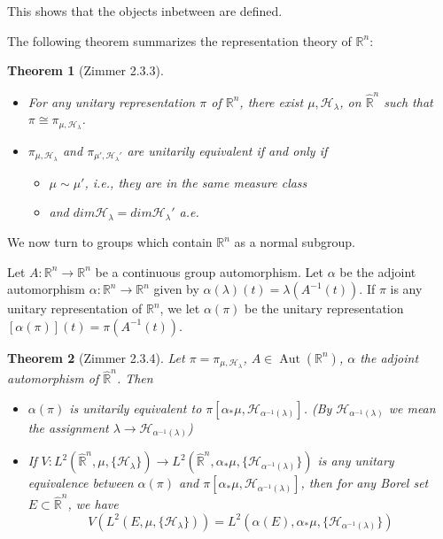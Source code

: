 \documentclass[
  12pt
]{article}
\newtheorem{thm}{Theorem}[section]
\theoremstyle{plain}
\newcommand{\mpi}{\ensuremath{\pi}\xspace}
\newcommand{\bbr}{\ensuremath{\mathbb{R}}\xspace}
\newcommand{\hilb}{\ensuremath{\mathscr{H}}\xspace}
\DeclareMathOperator{\Aut}{Aut}
\begin{document}
  This shows that the objects inbetween are defined.

  The following theorem summarizes the representation theory of $\bbr^n$:

  \begin{thm}[Zimmer 2.3.3]
    \label{thm:2.3.3}
    \begin{itemize}
      \item For any unitary representation $\pi$ of
        $\mathbb{R}^n$, there exist $\mu, \mathscr{H}_{\lambda}$, on
        $\hat{\mathbb{R}}^n$ such that $\pi \cong \pi_{\mu, \mathscr{H}_{\lambda}}$.
      \item $\pi_{\mu, \mathscr{H}_{\lambda}}$ and
        $\pi_{\mu', \mathscr{H}_{\lambda}'}$ are unitarily equivalent if and only if 
        \begin{itemize}
          \item $\mu \sim \mu'$, i.e., they are in the same measure class
          \item and $dim\mathscr{H}_{\lambda} = dim \mathscr{H}_{\lambda}'$ a.e.
        \end{itemize}
    \end{itemize}
  \end{thm}

  We now turn to groups which contain $\bbr^n$ as a normal subgroup.

  Let $A:\bbr^n \rightarrow \bbr^n$ be a continuous group automorphism. Let
  $\alpha$ be the adjoint automorphism $\alpha:\bbr^n \rightarrow \bbr^n$ given
  by $\alpha(\lambda)(t) = \lambda(A^{-1}(t))$. If \mpi is any unitary representation of $\bbr^n$, we let $\alpha(\pi)$  be the unitary representation $[\alpha(\pi)](t) = \pi(A^{-1}(t))$.


  \begin{thm}[Zimmer 2.3.4]
    \label{thm:2.3.4}
    Let $\pi = \pi_{\mu, \hilb_{\lambda}}$, $A\in  \Aut(\bbr^n)$, $\alpha$ the
    adjoint automorphism of $\hat{\bbr}^n$. Then
    \begin{itemize}
      \item $\alpha(\pi)$ is unitarily equivalent to $\pi[\alpha_*\mu, \hilb_{\alpha^{-1}(\lambda)}]$. (By $\hilb_{\alpha^{-1}(\lambda)}$ we mean the assignment $\lambda \rightarrow \hilb_{\alpha^{-1}(\lambda)}$)
      \item If $V:L^2(\hat{\bbr}^n, \mu, \{\hilb_{\lambda}\}) \rightarrow L^2(\hat{\bbr}^n, \alpha_*\mu, \{\hilb_{\alpha^{-1}(\lambda)}\})$ is any unitary equivalence between $\alpha(\pi)$ and $\pi[\alpha_*\mu, \hilb_{\alpha^{-1}(\lambda)}]$, then for any Borel set $E \subset \hat{\bbr}^n$, we have
        $$
        V(L^2(E, \mu, \{\hilb_{\lambda}\})) = L^2(\alpha(E), \alpha_*\mu, \{\hilb_{\alpha^{-1}(\lambda)}\})
        $$
    \end{itemize}
  \end{thm}
\end{document}
